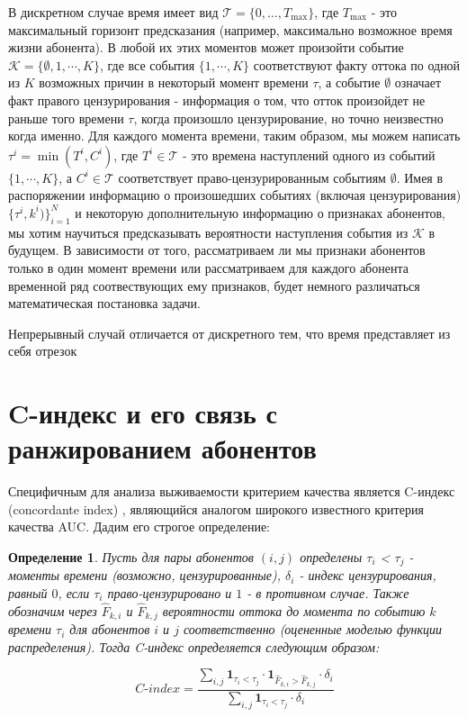 \documentclass[a4paper,14pt,oneside,openany]{memoir}
\newtheorem{definition}{Определение}
\begin{document}
В дискретном случае время имеет вид $\mathcal{T}=\{0,\ldots,T_{\max}\}$, где $T_{\max}$ - это максимальный горизонт предсказания (например, максимально возможное время жизни абонента). В любой их этих моментов может произойти событие $\mathcal{K}=\{\emptyset,1,\cdots,K\}$, где все события $\{1,\cdots,K\}$ соответствуют факту оттока по одной из $K$ возможных причин в некоторый момент времени $\tau$, а событие $\emptyset$ означает факт правого цензурирования - информация о том, что отток произойдет не раньше того времени $\tau$, когда произошло цензурирование, но точно неизвестно когда именно. Для каждого момента времени, таким образом, мы можем написать $\tau^i=\min(T^i,C^i)$, где $T^{i}\in\mathcal{T}$ - это времена наступлений одного из событий $\{1,\cdots,K\}$, а $C^{i}\in\mathcal{T}$ соответствует право-цензурированным событиям $\emptyset$. Имея в распоряжении информацию о произошедших событиях (включая цензурирования) $\{\tau^{i},k^{i})\}_{i=1}^{N}$ и некоторую дополнительную информацию о признаках абонентов, мы хотим научиться предсказывать вероятности наступления события из $\mathcal{K}$ в будущем. В зависимости от того, рассматриваем ли мы признаки абонентов только в один момент времени или рассматриваем для каждого абонента временной ряд соотвествующих ему признаков, будет немного различаться математическая постановка задачи. 

Непрерывный случай отличается от дискретного тем, что время представляет из себя отрезок 

\section{C-индекс и его связь с ранжированием абонентов}


Специфичным для анализа выживаемости критерием качества является C-индекс (concordante index) \cite{Alabdallah2022}, являющийся аналогом широкого известного критерия качества AUC. Дадим его строгое определение: 

\begin{definition}
Пусть для пары абонентов $(i,j)$ определены $\tau_i$  < $\tau_j$ - моменты времени (возможно, цензурированные), $\delta_i$ - индекс цензурирования, равный $0$, если $\tau_i$ право-цензурировано и $1$ - в противном случае. Также обозначим через $\hat{F}_{k,i}$ и $\hat{F}_{k,j}$ вероятности оттока до момента по событию $k$ времени $\tau_i$ для абонентов $i$ и $j$ соответственно (оцененные моделью функции распределения). Тогда C-индекс определяется следующим образом:

$$C\text{-}index =
\frac{
	\sum\limits_{i,j} \mathbf{1}_{\tau_i < \tau_j} \cdot \mathbf{1}_{\hat{F}_{k,i} > \hat{F}_{k,j}} \cdot \delta_i
}{
	\sum\limits_{i,j} \mathbf{1}_{\tau_i < \tau_j} \cdot \delta_i
}$$	
\end{definition}
\end{document}
